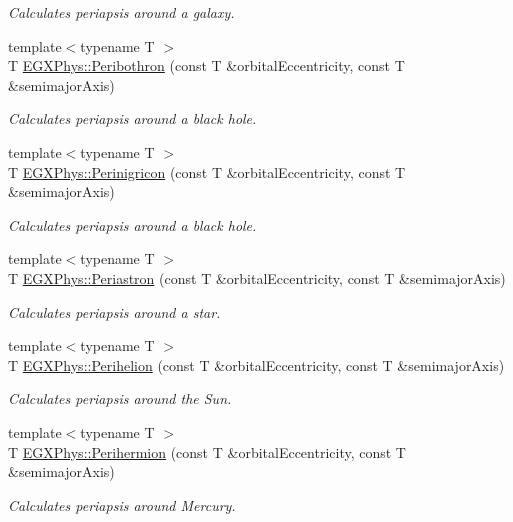 \begin{DoxyCompactItemize}
\begin{DoxyCompactList}\small\item\em Calculates periapsis around a galaxy. \end{DoxyCompactList}\item 
{\footnotesize template$<$typename T $>$ }\\T \hyperlink{group___astrophysics_gada5892309279a3a687c4eb2f88238e4e}{E\+G\+X\+Phys\+::\+Peribothron} (const T \&orbital\+Eccentricity, const T \&semimajor\+Axis)
\begin{DoxyCompactList}\small\item\em Calculates periapsis around a black hole. \end{DoxyCompactList}\item 
{\footnotesize template$<$typename T $>$ }\\T \hyperlink{group___astrophysics_ga99d86af90179994e17158b082c502fd4}{E\+G\+X\+Phys\+::\+Perinigricon} (const T \&orbital\+Eccentricity, const T \&semimajor\+Axis)
\begin{DoxyCompactList}\small\item\em Calculates periapsis around a black hole. \end{DoxyCompactList}\item 
{\footnotesize template$<$typename T $>$ }\\T \hyperlink{group___astrophysics_ga477de6824cbb5986cdae923141e21648}{E\+G\+X\+Phys\+::\+Periastron} (const T \&orbital\+Eccentricity, const T \&semimajor\+Axis)
\begin{DoxyCompactList}\small\item\em Calculates periapsis around a star. \end{DoxyCompactList}\item 
{\footnotesize template$<$typename T $>$ }\\T \hyperlink{group___astrophysics_ga941d285e3a0b48ada9c9f60925ff63c2}{E\+G\+X\+Phys\+::\+Perihelion} (const T \&orbital\+Eccentricity, const T \&semimajor\+Axis)
\begin{DoxyCompactList}\small\item\em Calculates periapsis around the Sun. \end{DoxyCompactList}\item 
{\footnotesize template$<$typename T $>$ }\\T \hyperlink{group___astrophysics_ga9562e9cbfd73019ae9cdaa643b843d63}{E\+G\+X\+Phys\+::\+Perihermion} (const T \&orbital\+Eccentricity, const T \&semimajor\+Axis)
\begin{DoxyCompactList}\small\item\em Calculates periapsis around Mercury. \end{DoxyCompactList}\item 

\end{DoxyCompactItemize}
